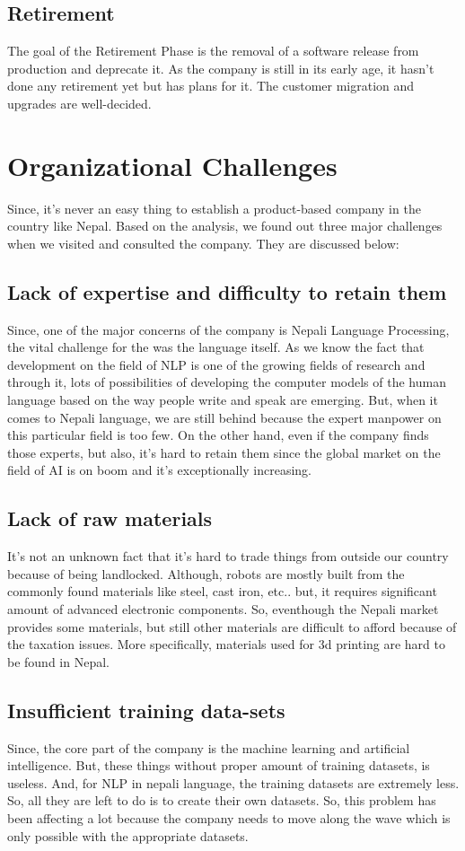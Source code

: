 \documentclass[12pt,a4paper]{scrreprt}
\begin{document}
\section{Retirement}
The goal of the Retirement Phase is the removal of a software release from production and deprecate it. As the company is still in its early age, it hasn't done any retirement yet but has plans for it. The customer migration and upgrades are well-decided.
\chapter{Organizational Challenges}
Since, it's never an easy thing to establish a product-based company in the country like Nepal. Based on the analysis, we found out three major challenges when we visited and consulted the company. They are discussed below:
\section{Lack of expertise and difficulty to retain them}
Since, one of the major concerns of the company is Nepali Language Processing, the vital challenge for the was the language itself. As we know the fact that development on the field of NLP is one of the growing fields of research and through it, lots of possibilities of developing the computer models of the human language based on the way people write and speak are emerging. But, when it comes to Nepali language, we are still behind because the expert manpower on this particular field is too few. On the other hand, even if the company finds those experts, but also, it's hard to retain them since the global market on the field of AI is on boom and it's exceptionally increasing.
\section{Lack of raw materials}
It's not an unknown fact that it's hard to trade things from outside our country because of being landlocked. Although, robots are mostly built from the commonly found materials like steel, cast iron, etc.. but, it requires significant amount of advanced electronic components. So, eventhough the Nepali market provides some materials, but still other materials are difficult to afford because of the taxation issues. More specifically, materials used for 3d printing are hard to be found in Nepal. 
\section{Insufficient training data-sets}
Since, the core part of the company is the machine learning and artificial intelligence. But, these things without proper amount of training datasets, is useless. And, for NLP in nepali language, the training datasets are extremely less. So, all they are left to do is to create their own datasets. So, this problem has been affecting a lot because the company needs to move along the wave which is only possible with the appropriate datasets.
\end{document}
